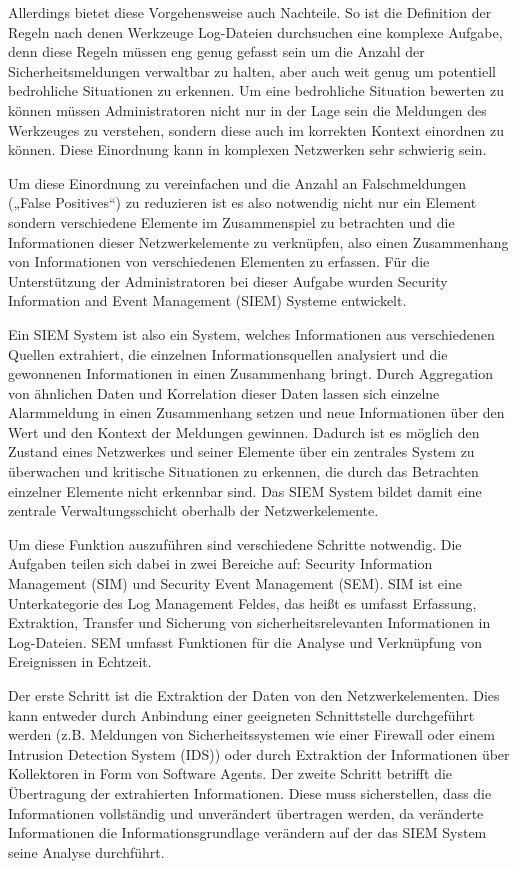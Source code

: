 Allerdings bietet diese Vorgehensweise auch Nachteile. So ist die Definition der Regeln nach denen Werkzeuge Log-Dateien durchsuchen eine komplexe Aufgabe, denn diese Regeln müssen eng genug gefasst sein um die Anzahl der Sicherheitsmeldungen verwaltbar zu halten, aber auch weit genug um potentiell bedrohliche Situationen zu erkennen. Um eine bedrohliche Situation bewerten zu können müssen Administratoren nicht nur in der Lage sein die Meldungen des Werkzeuges zu verstehen, sondern diese auch im korrekten Kontext einordnen zu können. Diese Einordnung kann in komplexen Netzwerken sehr schwierig sein.

Um diese Einordnung zu vereinfachen und die Anzahl an Falschmeldungen („False Positives“) zu reduzieren ist es also notwendig nicht nur ein Element sondern verschiedene Elemente im Zusammenspiel zu betrachten und die Informationen dieser Netzwerkelemente zu verknüpfen, also einen Zusammenhang von Informationen von verschiedenen Elementen zu erfassen. Für die Unterstützung der Administratoren bei dieser Aufgabe wurden Security Information and Event Management (SIEM) Systeme entwickelt.


Ein SIEM System ist also ein System, welches Informationen aus verschiedenen Quellen extrahiert, die einzelnen Informationsquellen analysiert und die gewonnenen Informationen in einen Zusammenhang bringt. Durch Aggregation von ähnlichen Daten und Korrelation dieser Daten lassen sich einzelne Alarmmeldung in einen Zusammenhang setzen und neue Informationen über den Wert und den Kontext der Meldungen gewinnen. Dadurch ist es möglich den Zustand eines Netzwerkes und seiner Elemente über ein zentrales System zu überwachen und kritische Situationen zu erkennen, die durch das Betrachten einzelner Elemente nicht erkennbar sind. Das SIEM System bildet damit eine zentrale Verwaltungsschicht oberhalb der Netzwerkelemente.

Um diese Funktion auszuführen sind verschiedene Schritte notwendig. Die Aufgaben teilen sich dabei in zwei Bereiche auf: Security Information Management (SIM) und Security Event Management (SEM). SIM ist eine Unterkategorie des Log Management Feldes, das heißt es umfasst Erfassung, Extraktion, Transfer und Sicherung von sicherheitsrelevanten Informationen in Log-Dateien. SEM umfasst Funktionen für die Analyse und Verknüpfung von Ereignissen in Echtzeit.

Der erste Schritt ist die Extraktion der Daten von den Netzwerkelementen. Dies kann entweder durch Anbindung einer geeigneten Schnittstelle durchgeführt werden (z.B. Meldungen von Sicherheitssystemen wie einer Firewall oder einem Intrusion Detection System (IDS)) oder durch Extraktion der Informationen über Kollektoren in Form von Software Agents. Der zweite Schritt betrifft die Übertragung der extrahierten Informationen. Diese muss sicherstellen, dass die Informationen vollständig und unverändert übertragen werden, da veränderte Informationen die Informationsgrundlage verändern auf der das SIEM System seine Analyse durchführt. 

